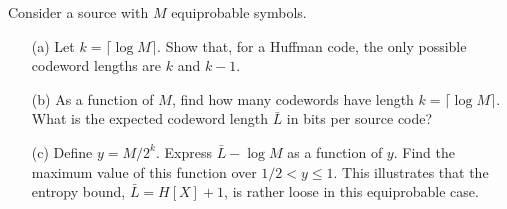\documentclass{assignment}
\begin{document}
\begin{prob}[2.14]
    Consider a source with $M$ equiprobable symbols.
    \begin{itemize}
        \item[(a)] Let $k=\lceil\log M\rceil$. Show that, for a Huffman code, the only possible codeword lengths are $k$ and $k-1$.
        \item[(b)] As a function of $M$, find how many codewords have length $k=\lceil\log M\rceil$. What is the expected codeword length $\bar{L}$ in bits per source code?
        \item[(c)] Define $y=M/2^k$. Express $\bar{L}-\log M$ as a function of $y$. Find the maximum value of this function over $1/2<y\leq 1$. This illustrates that the entropy bound, $\bar{L}=H[X]+1$, is rather loose in this equiprobable case.
    \end{itemize}
\end{prob}
\end{document}
